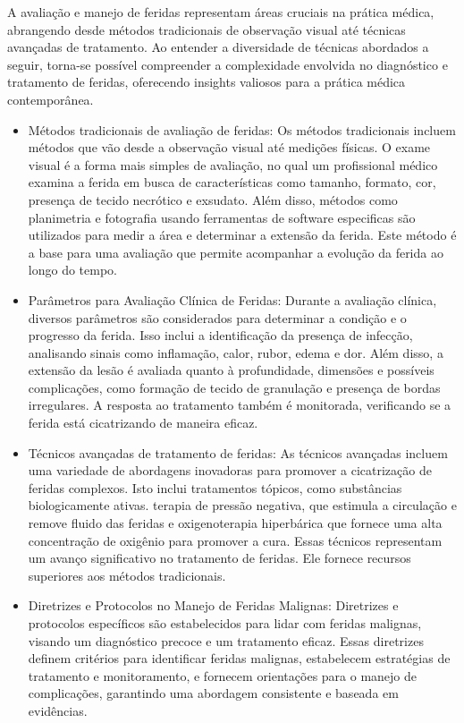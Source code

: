 A avaliação e manejo de feridas representam áreas cruciais na prática médica, abrangendo desde métodos tradicionais de observação visual até técnicas avançadas de tratamento. Ao entender a diversidade de técnicas abordados a seguir, torna-se possível compreender a complexidade envolvida no diagnóstico e tratamento de feridas, oferecendo insights valiosos para a prática médica contemporânea. \cite{tsichlakidou2019intervention}

\begin{itemize} 

    \item Métodos tradicionais de avaliação de feridas: Os métodos tradicionais incluem métodos que vão desde a observação visual até medições físicas. O exame visual é a forma mais simples de avaliação, no qual um profissional médico examina a ferida em busca de  características como tamanho, formato, cor, presença de tecido necrótico e exsudato. Além disso, métodos como planimetria e fotografia usando ferramentas de software especificas são utilizados para medir a área e determinar a extensão da ferida. Este método é a base para uma avaliação que permite acompanhar a evolução da ferida ao longo do tempo.

    \item Parâmetros para Avaliação Clínica de Feridas: Durante a avaliação clínica, diversos parâmetros são considerados para determinar a condição e o progresso da ferida. Isso inclui a identificação da presença de infecção, analisando sinais como inflamação, calor, rubor, edema e dor. Além disso, a extensão da lesão é avaliada quanto à profundidade, dimensões e possíveis complicações, como formação de tecido de granulação e presença de bordas irregulares. A resposta ao tratamento também é monitorada, verificando se a ferida está cicatrizando de maneira eficaz.

    \item Técnicos avançadas de tratamento de feridas: As técnicos avançadas incluem uma variedade de abordagens inovadoras para promover a cicatrização de feridas complexos. Isto inclui tratamentos tópicos, como substâncias biologicamente ativas. terapia de pressão negativa, que estimula a circulação e remove fluido das feridas e oxigenoterapia hiperbárica que fornece uma alta concentração de oxigênio para promover a cura. Essas técnicos representam um avanço significativo no tratamento de feridas. Ele fornece recursos superiores aos métodos tradicionais.

    \item Diretrizes e Protocolos no Manejo de Feridas Malignas: Diretrizes e protocolos específicos são estabelecidos para lidar com feridas malignas, visando um diagnóstico precoce e um tratamento eficaz. Essas diretrizes definem critérios para identificar feridas malignas, estabelecem estratégias de tratamento e monitoramento, e fornecem orientações para o manejo de complicações, garantindo uma abordagem consistente e baseada em evidências.


\end{itemize}
